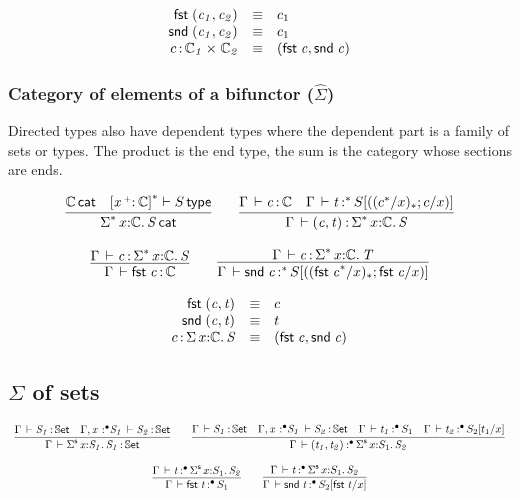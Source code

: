\documentclass[11pt]{article}
\theoremstyle{plain}
\begin{document}
\[
\begin{array}{rcll}
\mathit{\mathsf{fst}_{} \: \mathit{(c_1,c_2)_{}}} & \equiv & c_1 \\
\mathit{\mathsf{snd}_{} \: \mathit{(c_1,c_2)_{}}} & \equiv & c_1 \\
c \, \mathit{:} \, \mathit{\mathbb{C}_1} \times_{\mathit{}} \mathit{\mathbb{C}_2} & \equiv & \mathit{(\mathit{\mathsf{fst}_{} \: c},\mathit{\mathsf{snd}_{} \: c})_{}}
\end{array}
\]

\subsubsection{Category of elements of a bifunctor ($\hat{\Sigma}$)}

Directed types also have dependent types where the dependent part is a
family of sets or types. The product is the end type, the sum is the
category whose sections are ends.

\[
\begin{array}{c}
\infer{\wfdtp{\sigmacat{\vcond}{x}{\C}{S}}}
      {\wfdtp{\C} &
        \wftp{\dupctx{\vtptm{x}{\co}{\C}}{\vcond}}{S}}
\qquad
\infer{\ofdtp{\Gamma}{\pair{c}{t}}{\sigmacat{\vcond} x \C S}}
      {\ofdtp{\Gamma}{c}{\C} &
       \oftpe{\Gamma}{t}{\vcond}{\tsubst{S}{\substdup{(c^\vcond/x)}{\vcond}{c/x}}}}
\\ \\
\infer{\ofdtp{\Gamma}{\fst c}{\C}}
      {\ofdtp{\Gamma}{c}{\sigmacat{\vcond}{x}{\C}{S}}}
\qquad
\infer{\oftpe{\Gamma}{\snd c}{\vcond}{\tsubst{S}{\substdup{(\fst c^\vcond / x)}{\vcond}{\fst c/x}}}}
      {\ofdtp{\Gamma}{c}{\sigmacat{\vcond}{x}{\C}{T}}}
\end{array}
\]

\[
\begin{array}{rcll}
\mathit{\mathsf{fst}_{} \: \mathit{(c,t)_{}}} & \equiv & c \\
\mathit{\mathsf{snd}_{} \: \mathit{(c,t)_{}}} & \equiv & t \\
c \, \mathit{:} \, \textnormal{$\Sigma$}\,x \mathit{:} \mathbb{C}.\,\mathit{S} & \equiv & \mathit{(\mathit{\mathsf{fst}_{} \: c},\mathit{\mathsf{snd}_{} \: c})_{}}
\end{array}
\]

\subsection{$\Sigma$ of sets}

\[
\begin{array}{c}
\infer{\ofdtp{\Gamma}{\sigmaset{x}{S_1}{S_1}}{\types}}
      {\ofdtp{\Gamma}{S_1}{\types} &
        \ofdtp{\Gamma, \tptmv{x}{\bullet}{{S_1}}}{S_2}{\types}}
\qquad
\infer{\oftpe{\Gamma}{\pair{t_1}{t_2}}{\bullet}{\sigmaset x {S_1} {S_2}}}
      {\ofdtp{\Gamma}{S_1}{\types} &
        \ofdtp{\Gamma, \tptmv{x}{\bullet}{{S_1}}}{S_2}{\types} &
        \oftpe{\Gamma}{t_1}{\bullet}{S_1} &
        \oftpe{\Gamma}{t_2}{\bullet}{\subst{S_2}{t_1}x}}
\\ \\
\infer{\oftpe{\Gamma}{\fst t}{\bullet}{{S_1}}}
      {\oftpe{\Gamma}{t}{\bullet}{\sigmaset{x}{S_1}{S_2}}}
\qquad
\infer{\oftpe{\Gamma}{\snd t}{\bullet}{\subst{S_2}{\fst t}{x}}}
      {\oftpe{\Gamma}{t}{\bullet}{\sigmaset{x}{S_1}{S_2}}}
\end{array}
\]
\end{document}
